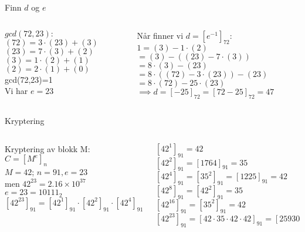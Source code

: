 \begin{frame}{Finn $d$ og $e$}
    \begin{columns}
        \begin{column}{0.45 \textwidth}
            $gcd(72,23):$\\
            $(72)=3\cdot (23)+(3)$\\
            $(23)=7\cdot(3)+(2)$\\
            $(3)=1\cdot (2)+(1)$\\
            $(2)=2\cdot (1)+(0)$\\
            gcd(72,23)=1\\
            Vi har $e=23$
        \end{column}
        \begin{column}{0.45 \textwidth}
            Når finner vi $d=[e^{-1}]_{72}$:\\
            $1=(3)-1\cdot (2)$\\
            $=(3)-((23)-7\cdot (3))$\\
            $=8\cdot (3)-(23)$\\
            $=8\cdot ((72)-3\cdot (23))-(23)$\\
            $=8\cdot (72)-25\cdot (23)$\\
            $\implies d=[-25]_{72}=[72-25]_{72}=47$
        \end{column}
    \end{columns}
\end{frame}

\begin{frame}{Kryptering}
    \begin{columns}
        \begin{column}{0.45 \textwidth}
            Kryptering av blokk M:\\
            $C=[M^{e}]_{n}$\\
            $M=42$; $n=91, e=23$\\
            men $42^{23}=2.16\times 10^{37}$\\
            \pause
            $e=23=10111_2$\\
            
            $[42^{23}]_{91}=[42^{1}]_{91}\cdot[42^{2}]_{91}\cdot[42^{4}]_{91}\cdot [42^{16}]_{91}$
        \end{column}
        \pause
        \begin{column}{0.45 \textwidth}
            $[42^1]_{91}=42$\\
            $[42^2]_{91}=[1764]_{91}=35$\\
            $[42^4]_{91}=[35^2]_{91}=[1225]_{91}=42$\\
            $[42^8]_{91}=[42^2]_{91}=35$\\
            $[42^{16}]_{91}=[35^2]_{91}=42$\\
            
            $[42^{23}]_{91}=[42\cdot 35\cdot 42\cdot 42]_{91}=[2593080]_{91}=35$
        \end{column}
    \end{columns}
\end{frame}

